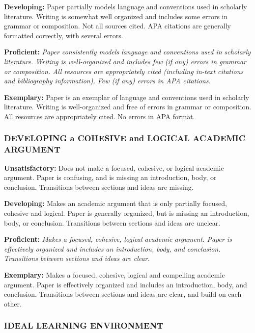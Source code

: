 \documentclass[
]{book}
\begin{document}
\textbf{Developing:} Paper partially models language and conventions used in scholarly literature. Writing is somewhat well organized and includes some errors in grammar or composition. Not all sources cited. APA citations are generally formatted correctly, with several errors.

\textbf{Proficient:} \emph{Paper consistently models language and conventions used in scholarly literature. Writing is well-organized and includes few (if any) errors in grammar or composition. All resources are appropriately cited (including in-text citations and bibliography information). Few (if any) errors in APA citations.}

\textbf{Exemplary:} Paper is an exemplar of language and conventions used in scholarly literature. Writing is well-organized and free of errors in grammar or composition. All resources are appropriately cited. No errors in APA format.

\hypertarget{developing-a-cohesive-and-logical-academic-argument-2}{%
\subsubsection*{DEVELOPING a COHESIVE and LOGICAL ACADEMIC ARGUMENT}\label{developing-a-cohesive-and-logical-academic-argument-2}}

\textbf{Unsatisfactory:} Does not make a focused, cohesive, or logical academic argument. Paper is confusing, and is missing an introduction, body, or conclusion. Transitions between sections and ideas are missing.

\textbf{Developing:} Makes an academic argument that is only partially focused, cohesive and logical. Paper is generally organized, but is missing an introduction, body, or conclusion. Transitions between sections and ideas are unclear.

\textbf{Proficient:} \emph{Makes a focused, cohesive, logical academic argument. Paper is effectively organized and includes an introduction, body, and conclusion. Transitions between sections and ideas are clear.}

\textbf{Exemplary:} Makes a focused, cohesive, logical and compelling academic argument. Paper is effectively organized and includes an introduction, body, and conclusion. Transitions between sections and ideas are clear, and build on each other.

\hypertarget{ideal-learning-environment}{%
\subsubsection*{IDEAL LEARNING ENVIRONMENT}\label{ideal-learning-environment}}
\end{document}
